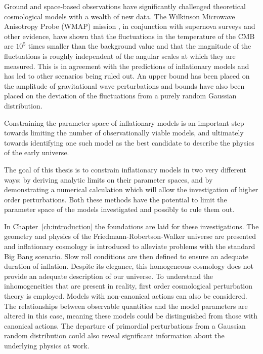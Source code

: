 Ground and space-based observations have significantly challenged theoretical
cosmological models with a wealth of new data. The Wilkinson Microwave
Anisotropy Probe (WMAP) mission \cite{Komatsu:2008hk}, in conjunction with supernova
surveys and other evidence, have shown that the fluctuations in
the temperature of the CMB are $10^{5}$ times smaller than the background value
and that the magnitude of the fluctuations is roughly independent of the
angular scales at which they are measured. This is in agreement with the
predictions of inflationary models and has led to other scenarios being ruled
out. An upper bound has been placed
on the amplitude of gravitational wave perturbations and bounds have also been
placed on the deviation of the fluctuations from a purely random Gaussian
distribution.

Constraining the parameter space of inflationary models is an important step
towards limiting the number of observationally viable models, and ultimately
towards identifying one such model as the best candidate to describe the
physics of the early
universe. 

The goal of this thesis is to constrain inflationary models in two very different
ways: by deriving analytic limits on their parameter spaces, and by demonstrating
a numerical calculation which will allow the investigation of higher order
perturbations. Both these methods have the potential to limit the
parameter space of the models investigated and possibly to rule them out.


In Chapter~\ref{ch:introduction} the foundations are laid for these investigations.
The geometry and physics of the Friedmann-Robertson-Walker universe are presented and
inflationary cosmology is introduced to alleviate problems with the standard Big
Bang scenario. Slow roll conditions are then defined to ensure an adequate duration
of inflation. Despite its elegance, this homogeneous cosmology does not provide an
adequate description of our universe. To understand the inhomogeneities that
are present in reality, first order
cosmological perturbation theory is employed. Models with non-canonical
actions can also be considered. The relationships between observable quantities and
the model parameters are altered in this case, meaning these models could be
distinguished from those with canonical actions. The departure of primordial
perturbations from a Gaussian random distribution could also reveal significant
information about the underlying physics at work.


